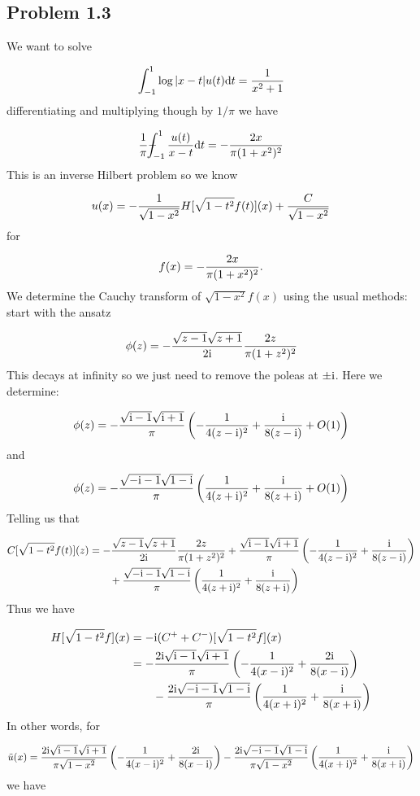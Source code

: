 \documentclass[12pt,a4paper]{article}
\def\D{ {\rm d} }
\def\I{ {\rm i} }
\def\Xint#1{ \mathchoice
   {\XXint\displaystyle\textstyle{#1} }%
   {\XXint\textstyle\scriptstyle{#1} }%
   {\XXint\scriptstyle\scriptscriptstyle{#1} }%
   {\XXint\scriptscriptstyle\scriptscriptstyle{#1} }%
   \!\int}
\def\XXint#1#2#3{ {\setbox0=\hbox{$#1{#2#3}{\int}$}
     \vcenter{\hbox{$#2#3$}}\kern-.5\wd0} }
\def\dashint{\Xint-}
\def\addtab#1={#1\;&=}
\def\ccr{\\\addtab}
\def\dt{\D t}
\def\addtab#1={#1\;&=}
\def\ccr{\\\addtab}
\begin{document}
\subsection{Problem 1.3}
We want to solve

\[
\int_{-1}^1 \log |x-t| u(t) \dt = {1 \over x^2 + 1}
\]
differentiating and multiplying though by $1/\pi$ we have

\[
{1 \over \pi} \dashint_{-1}^1 {u(t) \over x-t} \D t = -{2 x \over \pi (1+x^2)^2}
\]
This is an inverse Hilbert problem so we know

\[
u(x) = -{1 \over \sqrt{1-x^2} } H[\sqrt{1-t^2} f(t)](x)  + {C \over \sqrt{1-x^2}}
\]
for 

\[
f(x) =  -{2 x \over \pi (1+x^2)^2}.
\]
We determine the Cauchy transform of $\sqrt{1-x^2} f(x)$ using the usual methods:  start with the ansatz

\[
\phi(z) = -{\sqrt{z-1} \sqrt{z+1} \over 2 \I} {2 z \over \pi (1+z^2)^2}
\]
This decays at infinity so we just need to remove the poleas at $\pm \I$. Here we determine:

\[
\phi(z) = -{\sqrt{\I -1 } \sqrt{\I + 1} \over \pi} \left(-{1  \over 4 (z-\I)^2}  + {\I \over 8  (z-\I)} + O(1) \right)
\]
and

\[
\phi(z) = -{\sqrt{-\I -1 } \sqrt{1-\I } \over \pi} \left({1  \over 4 (z+\I)^2}  + {\I \over 8  (z+\I)} + O(1) \right)
\]
Telling us that


\begin{align*}
C[\sqrt{1-t^2} f(t)](z) &=  -{\sqrt{z-1} \sqrt{z+1} \over 2 \I} {2 z \over \pi (1+z^2)^2} +  {\sqrt{\I -1 } \sqrt{\I + 1} \over \pi} \left(-{1  \over 4 (z-\I)^2}  + {\I \over 8  (z-\I)} \right) \\
&\qquad+  {\sqrt{-\I -1 } \sqrt{1-\I } \over \pi} \left({1  \over 4 (z+\I)^2}  + {\I \over 8  (z+\I)} \right)
\end{align*}
Thus we have


\begin{align*}
H[\sqrt{1-t^2} f](x) &= -\I (C^+ + C^-)[\sqrt{1-t^2} f](x) \ccr
= -  {2\I \sqrt{\I -1 } \sqrt{\I + 1} \over \pi} \left(-{1  \over 4 (x-\I)^2}  + {2\I \over 8  (x-\I)} \right) \\
&\qquad-  {2\I \sqrt{-\I -1 } \sqrt{1-\I } \over \pi} \left({1  \over 4 (x+\I)^2}  + {\I \over 8  (x+\I)} \right)
\end{align*}
In other words, for

\[
\tilde u(x) = {2\I \sqrt{\I -1 } \sqrt{\I + 1} \over \pi \sqrt{1-x^2}} \left(-{1  \over 4 (x-\I)^2}  + {2\I \over 8  (x-\I)} \right) -  {2\I \sqrt{-\I -1 } \sqrt{1-\I } \over \pi \sqrt{1-x^2}} \left({1  \over 4 (x+\I)^2}  + {\I \over 8  (x+\I)} \right)
\]
we have
\end{document}
